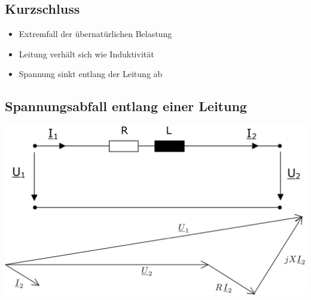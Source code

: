 \vspace{0.15cm}


\subsection{Kurzschluss}

\begin{itemize}
    \item Extremfall der übernatürlichen Belastung
    \item Leitung verhält sich wie Induktivität
    \item Spannung sinkt entlang der Leitung ab
\end{itemize}


\subsection{Spannungsabfall entlang einer Leitung}

\includegraphics[width=0.98\columnwidth, align=c]{images/Spannungsabfall_entlang_einer_Leitung.png}

\vspace{0.15cm}































